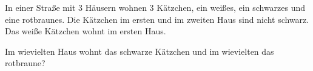 \begin{minipage}{13cm}
In einer Straße mit 3 Häusern wohnen 3 Kätzchen, ein weißes, ein schwarzes und eine rotbraunes.
Die Kätzchen im ersten und im zweiten Haus sind nicht schwarz. Das weiße Kätzchen wohnt
im ersten Haus.\par
Im wievielten Haus wohnt das schwarze Kätzchen und im wievielten das rotbraune?
\end{minipage}
\begin{minipage}{4cm}
\end{minipage}